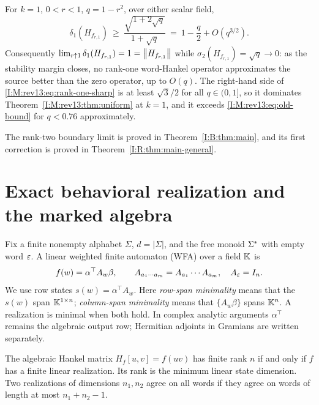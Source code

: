 \begin{theorem}\label{I:M:rev13:thm:rank-one-sharp}
For $k=1$, $0<r<1$, $q=1-r^2$, over either scalar field,
\begin{equation}\label{I:M:rev13:eq:rank-one-sharp}
\delta_1(H_{f_{r,1}})\ \ge\ \frac{\sqrt{1+2\sqrt q}}{1+\sqrt q}\ =\ 1-\frac q{2}+O(q^{3/2}).
\end{equation}
Consequently $\lim_{r\uparrow1}\delta_1(H_{f_{r,1}})=1=\left\lVert H_{f_{r,1}}\right\rVert$ while
$\sigma_2(H_{f_{r,1}})=\sqrt q\to0$: as the stability margin closes, no rank-one
word-Hankel operator approximates the source better than the zero operator, up to
$O(q)$. The right-hand side of \eqref{I:M:rev13:eq:rank-one-sharp} is at least $\sqrt3/2$ for all
$q\in(0,1]$, so it dominates Theorem~\ref{I:M:rev13:thm:uniform} at $k=1$, and it exceeds
\eqref{I:M:rev13:eq:old-bound} for $q<0.76$ approximately.
\end{theorem}




\begin{remark}The rank-two boundary limit is proved in Theorem~\ref{I:B:thm:main}, and its first correction is proved in Theorem~\ref{I:R:thm:main-general}.\end{remark}

\section{Exact behavioral realization and the marked algebra}\label{I:S:sec:exact}
Fix a finite nonempty alphabet $\Sigma$, $d=|\Sigma|$, and the free monoid $\Sigma^*$ with empty word $\varepsilon$. A linear weighted finite automaton (WFA) over a field $\mathbb K$ is
\[
 f(w)=\alpha^\top A_w\beta,\qquad A_{a_1\cdots a_m}=A_{a_1}\cdots A_{a_m},\quad A_\varepsilon=I_n.
\]
We use row states $s(w)=\alpha^\top A_w$. Here \emph{row-span minimality} means that the $s(w)$ span $\mathbb K^{1\times n}$; \emph{column-span minimality} means that $\{A_w\beta\}$ spans $\mathbb K^n$. A realization is minimal when both hold. In complex analytic arguments $\alpha^\top$ remains the algebraic output row; Hermitian adjoints in Gramians are written separately.

\begin{theorem}\label{I:S:thm:realization}
The algebraic Hankel matrix $H_f[u,v]=f(uv)$ has finite rank $n$ if and only if $f$ has a finite linear realization. Its rank is the minimum linear state dimension. Two realizations of dimensions $n_1,n_2$ agree on all words if they agree on words of length at most $n_1+n_2-1$.
\end{theorem}


